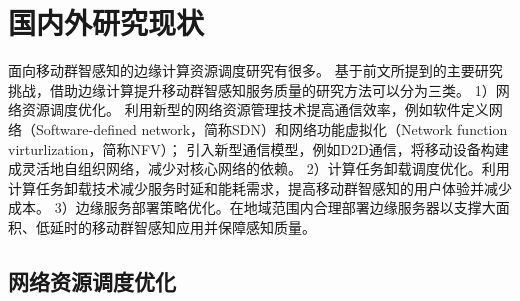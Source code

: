 








\section{国内外研究现状}

面向移动群智感知的边缘计算资源调度研究有很多。
基于前文所提到的主要研究挑战，借助边缘计算提升移动群智感知服务质量的研究方法可以分为三类。
1）网络资源调度优化。%
利用新型的网络资源管理技术提高通信效率，例如软件定义网络（Software-defined network，简称SDN）和网络功能虚拟化（Network function virturlization，简称NFV）；
引入新型通信模型，例如D2D通信，将移动设备构建成灵活地自组织网络，减少对核心网络的依赖。
2）计算任务卸载调度优化。利用计算任务卸载技术减少服务时延和能耗需求，提高移动群智感知的用户体验并减少成本。
3）边缘服务部署策略优化。在地域范围内合理部署边缘服务器以支撑大面积、低延时的移动群智感知应用并保障感知质量。

\subsection{网络资源调度优化}

